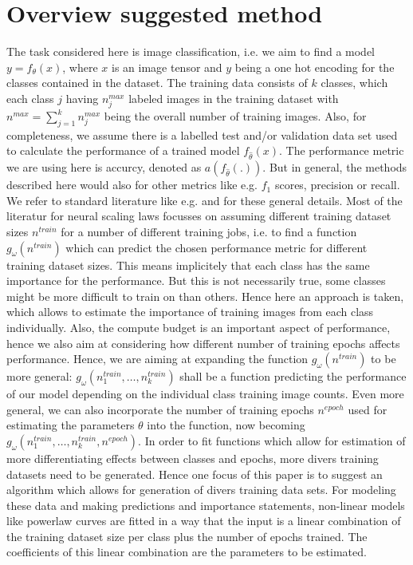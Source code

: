 \documentclass{article} %
\begin{document}
\section{Overview suggested method}

     The task considered here is image classification, i.e. we aim to find a model $y = f_{\theta}(x)$, where $x$ is an image tensor and $y$ being a one hot encoding for the classes contained in the dataset.
     The training data consists of $k$ classes, which each class $j$ having $n_j^{max}$ labeled images in the training dataset with $n^{max} = \sum_{j= 1}^k n_j^{max}$ being the overall number of training images.
     Also, for completeness, we assume there is a labelled test and/or validation data set used to calculate the performance of a trained model $f_{\hat{\theta}}(x)$.
     The performance metric we are using here is accurcy, denoted as $a(f_{\hat{\theta}}(.))$. But in general, the methods described here would also for other metrics like e.g. $f_1$ scores, precision or recall.
     We refer to standard literature like e.g. \cite{Goodfellowetal2016} and \cite{Bishop2006PatternRecog} for these general details.
     Most of the literatur for neural scaling laws focusses on assuming different training dataset sizes $n^{train}$ for a number of different training jobs, i.e. to find a function $g_{\omega}(n^{train})$ which can predict the chosen performance metric for different training dataset sizes. 
     This means implicitely that each class has the same importance for the performance.
     But this is not necessarily true, some classes might be more difficult to train on than others.
     Hence here an approach is taken, which allows to estimate the importance of training images from each class individually.
     Also, the compute budget is an important aspect of performance, hence we also aim at considering how different number of training epochs affects performance.
     Hence, we are aiming at expanding the function $g_{\omega}(n^{train})$ to be more general: $g_{\omega}(n_1^{train}, \dots, n_k^{train})$ shall be a function predicting the performance of our model depending on the individual class training image counts.
     Even more general, we can also incorporate the number of training epochs $n^{epoch}$ used for estimating the parameters $\theta$ into the function, now becoming $g_{\omega}(n_1^{train}, \dots, n_k^{train}, n^{epoch})$.
     In order to fit functions which allow for estimation of more differentiating effects between classes and epochs, more divers training datasets need to be generated.
     Hence one focus of this paper is to suggest an algorithm which allows for generation of divers training data sets.
     For modeling these data and making predictions and importance statements, non-linear models like powerlaw curves are fitted in a way that the input is a linear combination of the training dataset size per class plus the number of epochs trained.
     The coefficients of this linear combination are the parameters to be estimated.
\end{document}
